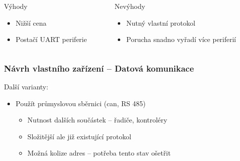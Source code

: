 \documentclass[%
  12pt,       				%
	t,                  %
	aspectratio=1610,   %
	unicode,						%
]{beamer}				    	%
\begin{document}
\begin{frame}[fragile]
		\begin{columns}[T] 								%
		\begin{column}{0.5\textwidth}		%
			\begin{block}{Výhody}
				\begin{itemize}
					\item Nižší cena \\
					\item Postačí UART periferie
				\end{itemize}
			\end{block}
		\end{column}
		\begin{column}{0.5\textwidth}		%
			\begin{alertblock}{Nevýhody}
				\begin{itemize}
					\item Nutný vlastní protokol \\
					\item Porucha snadno vyřadí více periferií
				\end{itemize}
			\end{alertblock}
		\end{column}
	\end{columns}											%
\end{frame}

\begin{frame}[fragile]
	\frametitle{Návrh vlastního zařízení -- Datová komunikace}
	Další varianty:\\[1ex]
	\begin{itemize}
		\item Použít průmyslovou sběrnici (\acs{can}, RS 485)
		\begin{itemize}
			\item Nutnost dalších součástek -- řadiče, kontroléry
			\item Složitější ale již existující protokol
			\item Možná kolize adres -- potřeba tento stav ošetřit
		\end{itemize}
	\end{itemize}
\end{frame}
\end{document}
